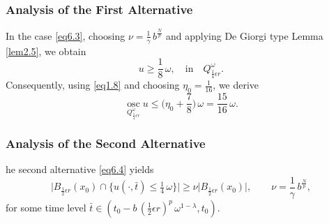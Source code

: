 \documentclass[a4paper,11pt,fullpage]{article}
\DeclareMathOperator*{\osc}{osc}
\numberwithin{equation}{section}
\begin{document}
\subsubsection{Analysis of the First Alternative}
In the  case \eqref{eq6.3}, choosing $\nu=\frac{1}{\gamma}\,b^{\frac{N}{p}}$ and applying De Giorgi type Lemma \ref{lem2.5}, we obtain 
\begin{equation*}
u\geqslant \frac{1}{8}\,\omega,\quad \text{in}\quad  Q^{\omega}_{\frac{1}{4}\epsilon r}.
\end{equation*}
Consequently, using \eqref{eq1.8} and choosing $\eta_0=\frac{1}{16}$, we derive
\begin{equation}\label{eq6.5}
\osc\limits_{Q^{\omega}_{\frac{1}{4}\epsilon r}} u\leqslant \biggr(\eta_0+\frac{7}{8}\biggr)\,\omega=\frac{15}{16}\,\omega.
\end{equation}

\subsubsection{Analysis of the Second Alternative}

he second alternative \eqref{eq6.4} yields
\begin{equation}\label{eq6.4*}
\big| B_{\frac{1}{2}\epsilon r}(x_0)\cap\{u(\cdot, \bar{t})\leqslant \tfrac{1}{4}\,\omega\}\big|\geqslant \nu \big|B_{\frac{1}{2}\epsilon r}(x_0)\big|,\qquad\nu=\frac{1}{\gamma}\,b^{\frac{N}{p}},
\end{equation}
for some time level $\bar{t}\in(t_0-b\,(\frac{1}{2}\epsilon r)^{p}\,\omega^{1-\lambda}, t_0)$. 
\end{document}
